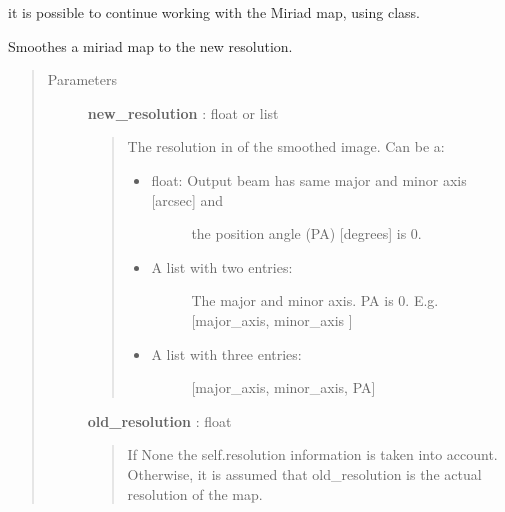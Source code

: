 \documentclass[a4paper,10pt,english]{sphinxmanual}
\begin{document}
\begin{fulllineitems}
\begin{fulllineitems}
it is possible to continue working with the Miriad map, using
 class.

\end{fulllineitems}


\begin{fulllineitems}
\label{maps:astrolyze.maps.miriad.MiriadMap.smooth}
Smoothes a miriad map to the new resolution.
\begin{quote}\begin{description}
\item[{Parameters }] \leavevmode
\textbf{new\_resolution} : float or list
\begin{quote}

The resolution in of the smoothed image.
Can be a:
\begin{itemize}
\item {} \begin{description}
\item[{float: Output beam has same major and minor axis {[}arcsec{]} and}] \leavevmode
the position angle (PA) {[}degrees{]} is 0.

\end{description}

\item {} \begin{description}
\item[{A list with two entries:}] \leavevmode
The major and minor axis. PA is 0.
E.g. {[}major\_axis, minor\_axis {]}

\end{description}

\item {} \begin{description}
\item[{A list with three entries:}] \leavevmode
{[}major\_axis, minor\_axis, PA{]}

\end{description}

\end{itemize}
\end{quote}

\textbf{old\_resolution} : float
\begin{quote}

If None the self.resolution information is taken into account.
Otherwise, it is assumed that old\_resolution is the actual
resolution of the map.
\end{quote}


\end{description}
\end{quote}
\end{fulllineitems}
\end{fulllineitems}
\end{document}
